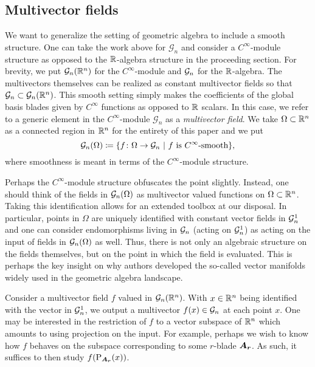 \subsection{Multivector fields}

We want to generalize the setting of geometric algebra to include a smooth structure. One can take the work above for $\mathcal{G}_n$ and consider a $C^{\infty}$-module structure as opposed to the $\mathbb{R}$-algebra structure in the proceeding section. For brevity, we put $\mathcal{G}_n(\mathbb{R}^n)$ for the $C^\infty$-module and $\mathcal{G}_n$ for the $\mathbb{R}$-algebra. The multivectors themselves can be realized as constant multivector fields so that $\mathcal{G}_n \subset \mathcal{G}_n(\mathbb{R}^n)$. This smooth setting simply makes the coefficients of the global basis blades given by $C^\infty$ functions as opposed to $\mathbb{R}$ scalars.  In this case, we refer to a generic element in the $C^{\infty}$-module $\mathcal{G}_n$ as a \emph{multivector field}. We take $\Omega \subset \mathbb{R}^n$ as a connected region in $\mathbb{R}^n$ for the entirety of this paper and we put
\[
\mathcal{G}_n(\Omega) \coloneqq \{ f \colon \Omega \to \mathcal{G}_n ~\vert~ \textrm{$f$ is $C^\infty$-smooth}\},
\]
where smoothness is meant in terms of the $C^\infty$-module structure.

Perhaps the $C^\infty$-module structure obfuscates the point slightly.  Instead, one should think of the fields in $\mathcal{G}_n(\Omega)$ as multivector valued functions on $\Omega \subset \mathbb{R}^n$.  Taking this identification allows for an extended toolbox at our disposal.  In particular, points in $\Omega$ are uniquely identified with constant vector fields in $\mathcal{G}_n^1$ and one can consider endomorphisms living in $\mathcal{G}_n$ (acting on $\mathcal{G}_n^1$) as acting on the input of fields in $\mathcal{G}_n(\Omega)$ as well.  Thus, there is not only an algebraic structure on the fields themselves, but on the point in which the field is evaluated.  This is perhaps the key insight on why authors developed the so-called vector manifolds widely used in the geometric algebra landscape.

\begin{example}
    Consider a multivector field $f$ valued in $\mathcal{G}_n(\mathbb{R}^n)$.  With $x\in \mathbb{R}^n$ being identified with the vector in $\mathcal{G}_n^1$, we output a multivector $f(x) \in \mathcal{G}_n$ at each point $x$.  One may be interested in the restriction of $f$ to a vector subspace of $\mathbb{R}^n$ which amounts to using projection on the input.  For example, perhaps we wish to know how $f$ behaves on the subspace corresponding to some $r$-blade $\boldsymbol{A_r}$.  As such, it suffices to then study $f(\operatorname{P}_{\boldsymbol{A_r}}(x))$.  
\end{example}

